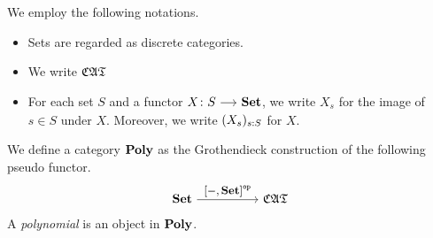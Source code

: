 \documentclass[a4paper,dvipsnames, 11pt]{amsart}
\begin{document}
\maketitle
\begin{notation}
	We employ the following notations.
	\begin{itemize}
		\item %
			Sets are regarded as discrete categories.
		\item %
			We write ${\mathfrak{CAT}}$
		\item %
			For each set $S$ and a functor $X\colon S\arr\Set$,
			we write $X_s$ for the image of $s\in S$ under $X$.
			Moreover, we write $(X_s)_{s: S}$ for $X$.
	\end{itemize}
\end{notation}
\begin{definition}
	We define a category $\mathbf{Poly}$ as the Grothendieck construction of the following pseudo functor.
	\[
		\Set
		\arr"\left[-,\Set\right]^\op"[][5]
		\CATbi
	\]
	A \emph{polynomial} is an object in $\mathbf{Poly}$.
\end{definition}



\end{document}
